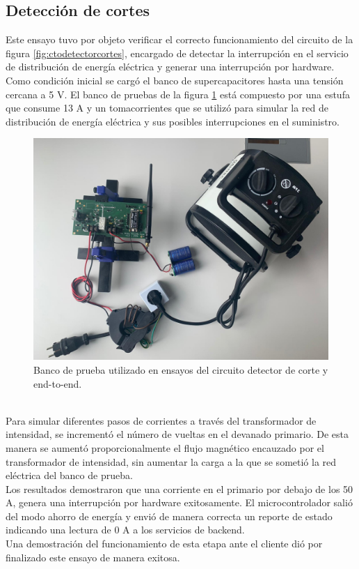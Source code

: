 \vspace{200px}
\subsection{Detecci\'{o}n de cortes}
Este ensayo tuvo por objeto verificar el correcto funcionamiento del circuito de la figura \ref{fig:ctodetectorcortes}, encargado de detectar la interrupci\'{o}n en el servicio de distribuci\'{o}n de energía el\'{e}ctrica y generar una interrupci\'{o}n por hardware.\\
Como condici\'{o}n inicial se carg\'{o} el banco de supercapacitores hasta una tensión cercana a 5 V. 
El banco de pruebas de la figura \ref{fig:bancopruebae2e2} est\'{a} compuesto por una estufa que consume 13 A y un tomacorrientes que se utiliz\'{o} para simular la red de distribuci\'{o}n de energía el\'{e}ctrica y sus posibles interrupciones en el suministro.\\
\begin{figure}[h]
	\centering
	\includegraphics[width=1.0\linewidth]{Figures/banco_prueba_e2e_1}
	\caption{Banco de prueba utilizado en ensayos del circuito detector de corte y end-to-end.}
	\label{fig:bancopruebae2e2}
\end{figure}\\
Para simular diferentes pasos de corrientes a trav\'{e}s del transformador de intensidad, se increment\'{o} el n\'{u}mero de vueltas en el devanado primario. De esta manera se aument\'{o} proporcionalmente el flujo magn\'{e}tico encauzado por el transformador de intensidad, sin aumentar la carga a la que se someti\'{o} la red el\'{e}ctrica del banco de prueba.\\
Los resultados demostraron que una corriente en el primario por debajo de los 50 A, genera una interrupci\'{o}n por hardware exitosamente. El microcontrolador sali\'{o} del modo ahorro de energía y envi\'{o} de manera correcta un reporte de estado indicando una lectura de 0 A a los servicios de backend.\\
Una demostraci\'{o}n del funcionamiento de esta etapa ante el cliente dió por finalizado este ensayo de manera exitosa.\\

